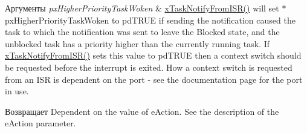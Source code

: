 \begin{DoxyParams}{Аргументы}
{\em px\+Higher\+Priority\+Task\+Woken} & \mbox{\hyperlink{task_8h_a1ed9129068b96a909356bd0369c5ecb0}{x\+Task\+Notify\+From\+I\+S\+R()}} will set $\ast$px\+Higher\+Priority\+Task\+Woken to pd\+T\+R\+UE if sending the notification caused the task to which the notification was sent to leave the Blocked state, and the unblocked task has a priority higher than the currently running task. If \mbox{\hyperlink{task_8h_a1ed9129068b96a909356bd0369c5ecb0}{x\+Task\+Notify\+From\+I\+S\+R()}} sets this value to pd\+T\+R\+UE then a context switch should be requested before the interrupt is exited. How a context switch is requested from an I\+SR is dependent on the port -\/ see the documentation page for the port in use.\\
\hline
\end{DoxyParams}
\begin{DoxyReturn}{Возвращает}
Dependent on the value of e\+Action. See the description of the e\+Action parameter. 
\end{DoxyReturn}
